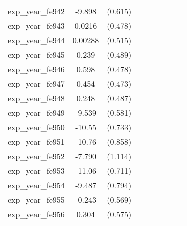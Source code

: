 {\begin{tabular}{l*{4}{cc}}
exp\_year\_fe942&   -9.898\sym{***}&  (0.615)&                  &         &                  &         &                  &         \\
exp\_year\_fe943&   0.0216         &  (0.478)&                  &         &                  &         &                  &         \\
exp\_year\_fe944&  0.00288         &  (0.515)&                  &         &                  &         &                  &         \\
exp\_year\_fe945&    0.239         &  (0.489)&                  &         &                  &         &                  &         \\
exp\_year\_fe946&    0.598         &  (0.478)&                  &         &                  &         &                  &         \\
exp\_year\_fe947&    0.454         &  (0.473)&                  &         &                  &         &                  &         \\
exp\_year\_fe948&    0.248         &  (0.487)&                  &         &                  &         &                  &         \\
exp\_year\_fe949&   -9.539\sym{***}&  (0.581)&                  &         &                  &         &                  &         \\
exp\_year\_fe950&   -10.55\sym{***}&  (0.733)&                  &         &                  &         &                  &         \\
exp\_year\_fe951&   -10.76\sym{***}&  (0.858)&                  &         &                  &         &                  &         \\
exp\_year\_fe952&   -7.790\sym{***}&  (1.114)&                  &         &                  &         &                  &         \\
exp\_year\_fe953&   -11.06\sym{***}&  (0.711)&                  &         &                  &         &                  &         \\
exp\_year\_fe954&   -9.487\sym{***}&  (0.794)&                  &         &                  &         &                  &         \\
exp\_year\_fe955&   -0.243         &  (0.569)&                  &         &                  &         &                  &         \\
exp\_year\_fe956&    0.304         &  (0.575)&                  &         &                  &         &                  &         \\

\end{tabular}}
